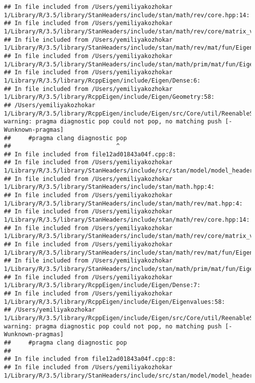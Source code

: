 \documentclass[]{article}
\begin{document}
\begin{verbatim}
## In file included from /Users/yemiliyakozhokar 1/Library/R/3.5/library/StanHeaders/include/stan/math/rev/core.hpp:14:
## In file included from /Users/yemiliyakozhokar 1/Library/R/3.5/library/StanHeaders/include/stan/math/rev/core/matrix_vari.hpp:4:
## In file included from /Users/yemiliyakozhokar 1/Library/R/3.5/library/StanHeaders/include/stan/math/rev/mat/fun/Eigen_NumTraits.hpp:4:
## In file included from /Users/yemiliyakozhokar 1/Library/R/3.5/library/StanHeaders/include/stan/math/prim/mat/fun/Eigen.hpp:4:
## In file included from /Users/yemiliyakozhokar 1/Library/R/3.5/library/RcppEigen/include/Eigen/Dense:6:
## In file included from /Users/yemiliyakozhokar 1/Library/R/3.5/library/RcppEigen/include/Eigen/Geometry:58:
## /Users/yemiliyakozhokar 1/Library/R/3.5/library/RcppEigen/include/Eigen/src/Core/util/ReenableStupidWarnings.h:10:30: warning: pragma diagnostic pop could not pop, no matching push [-Wunknown-pragmas]
##     #pragma clang diagnostic pop
##                              ^
## In file included from file12ad01843a04f.cpp:8:
## In file included from /Users/yemiliyakozhokar 1/Library/R/3.5/library/StanHeaders/include/src/stan/model/model_header.hpp:4:
## In file included from /Users/yemiliyakozhokar 1/Library/R/3.5/library/StanHeaders/include/stan/math.hpp:4:
## In file included from /Users/yemiliyakozhokar 1/Library/R/3.5/library/StanHeaders/include/stan/math/rev/mat.hpp:4:
## In file included from /Users/yemiliyakozhokar 1/Library/R/3.5/library/StanHeaders/include/stan/math/rev/core.hpp:14:
## In file included from /Users/yemiliyakozhokar 1/Library/R/3.5/library/StanHeaders/include/stan/math/rev/core/matrix_vari.hpp:4:
## In file included from /Users/yemiliyakozhokar 1/Library/R/3.5/library/StanHeaders/include/stan/math/rev/mat/fun/Eigen_NumTraits.hpp:4:
## In file included from /Users/yemiliyakozhokar 1/Library/R/3.5/library/StanHeaders/include/stan/math/prim/mat/fun/Eigen.hpp:4:
## In file included from /Users/yemiliyakozhokar 1/Library/R/3.5/library/RcppEigen/include/Eigen/Dense:7:
## In file included from /Users/yemiliyakozhokar 1/Library/R/3.5/library/RcppEigen/include/Eigen/Eigenvalues:58:
## /Users/yemiliyakozhokar 1/Library/R/3.5/library/RcppEigen/include/Eigen/src/Core/util/ReenableStupidWarnings.h:10:30: warning: pragma diagnostic pop could not pop, no matching push [-Wunknown-pragmas]
##     #pragma clang diagnostic pop
##                              ^
## In file included from file12ad01843a04f.cpp:8:
## In file included from /Users/yemiliyakozhokar 1/Library/R/3.5/library/StanHeaders/include/src/stan/model/model_header.hpp:4:

\end{verbatim}
\end{document}
